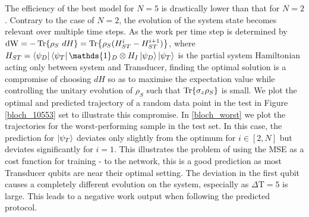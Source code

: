 The efficiency of the best model for $N=5$ is drastically lower than that for $N=2$.
Contrary to the case of $N=2$, the evolution of the system state becomes relevant over multiple time steps.
As the work per time step is determined by $\mathrm{dW} = -\Tr{\rho_S \ dH} = \Tr{\rho_S (H_{ST}^i - H_{ST}^{i+1})}$, where $H_{ST} = \bra{\psi_D}\bra{\psi_T} \mathds{1}_D \otimes H_I \ket{\psi_D} \ket{\psi_T}$ is the partial system Hamiltonian acting only between system and Transducer, finding the optimal solution is a compromise of choosing $dH$ so as to maximise the expectation value while controlling the unitary evolution of $\rho_S$ such that $\Tr{\sigma_z \rho_S}$ is small.
We plot the optimal and predicted trajectory of a random data point in the test in Figure \ref{bloch_10553} set to illustrate this compromise.
In \ref{bloch_worst} we plot the trajectories for the worst-performing sample in the test set.
In this case, the prediction for $\ket{\psi_T}$ deviates only slightly from the optimum for $i \in [2, N]$ but deviates significantly for $i=1$.
This illustrates the problem of using the MSE as a cost function for training - to the network, this is a good prediction as most Transducer qubits are near their optimal setting.
The deviation in the first qubit causes a completely different evolution on the system, especially as $\Delta \mathrm{T} = 5$ is large.
This leads to a negative work output when following the predicted protocol.


